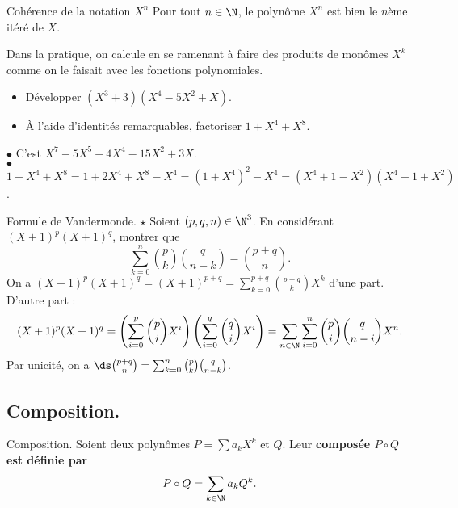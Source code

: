 \documentclass[11pt]{article}
\begin{document}
\begin{prop}{Cohérence de la notation $X^n$}{}
    Pour tout $n\in\N$, le polynôme $X^n$ est bien le $n$ème itéré de $X$.
\end{prop}

\begin{ex}{}{}
    Dans la pratique, on calcule en se ramenant à faire des produits de monômes $X^k$ comme on le faisait avec les fonctions polynomiales.
    \begin{itemize}
        \item Développer $(X^3+3)(X^4-5X^2+X)$.
        \item À l'aide d'identités remarquables, factoriser $1+X^4+X^8$.
    \end{itemize}
    \tcblower
    $\bullet$ C'est $X^7-5X^5+4X^4-15X^2+3X$.\\
    $\bullet$ $1+X^4+X^8=1+2X^4+X^8-X^4=(1+X^4)^2-X^4=(X^4+1-X^2)(X^4+1+X^2)$.
\end{ex}

\begin{ex}{Formule de Vandermonde. $\star$}{}
    Soient $(p,q,n)\in\N^3$. En considérant $(X+1)^p(X+1)^q$, montrer que
    \begin{equation*}
        \sum_{k=0}^n\binom{p}{k}\binom{q}{n-k}=\binom{p+q}{n}.
    \end{equation*}
    \tcblower
    On a $(X+1)^p(X+1)^q=(X+1)^{p+q}=\sum_{k=0}^{p+q}\binom{p+q}{k}X^k$ d'une part.\\
    D'autre part :
    \begin{equation*}
        (X+1)^p(X+1)^q=\left(\sum_{i=0}^p\binom{p}{i}X^i\right)\left( \sum_{i=0}^q\binom{q}{i}X^i \right)=\sum_{n\in\N}\sum_{i=0}^n\binom{p}{i}\binom{q}{n-i}X^n.
    \end{equation*}
    Par unicité, on a $\ds\binom{p+q}{n}=\sum_{k=0}^n\binom{p}{k}\binom{q}{n-k}$.
\end{ex}

\subsection{Composition.}

\begin{defi}{Composition.}{}
    Soient deux polynômes $P=\sum a_kX^k$ et $Q$. Leur \bf{composée} $P\circ Q$ est définie par
    \begin{equation*}
        P\circ Q = \sum_{k\in\N}a_kQ^k.
    \end{equation*}
\end{defi}
\end{document}
